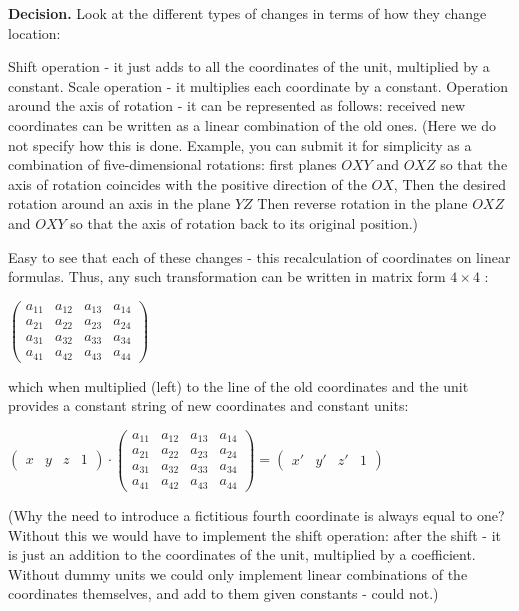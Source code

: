\textbf{Decision.} Look at the different types of changes in terms of how they change location:

Shift operation - it just adds to all the coordinates of the unit, multiplied by a constant.
Scale operation - it multiplies each coordinate by a constant.
Operation around the axis of rotation - it can be represented as follows: received new coordinates can be written as a linear combination of the old ones.
(Here we do not specify how this is done. Example, you can submit it for simplicity as a combination of five-dimensional rotations: first planes $OXY$ and $OXZ$ so that the axis of rotation coincides with the positive direction of the $OX$, Then the desired rotation around an axis in the plane $YZ$ Then reverse rotation in the plane $OXZ$ and $OXY$ so that the axis of rotation back to its original position.)

Easy to see that each of these changes - this recalculation of coordinates on linear formulas. Thus, any such transformation can be written in matrix form $4 \times 4$ :

$\left(\begin{array}{cccc}
a_{11} & a_{12} & a_{13} & a_{14}\\
a_{21} & a_{22} & a_{23} & a_{24}\\
a_{31} & a_{32} & a_{33} & a_{34}\\
a_{41} & a_{42} & a_{43} & a_{44}
\end{array}\right)$

which when multiplied (left) to the line of the old coordinates and the unit provides a constant string of new coordinates and constant units:

$\left(\begin{array}{cccc}
x & y & z & 1\end{array}\right)\cdot\left(\begin{array}{cccc}
a_{11} & a_{12} & a_{13} & a_{14}\\
a_{21} & a_{22} & a_{23} & a_{24}\\
a_{31} & a_{32} & a_{33} & a_{34}\\
a_{41} & a_{42} & a_{43} & a_{44}
\end{array}\right)=\left(\begin{array}{cccc}
x' & y' & z' & 1\end{array}\right)$

(Why the need to introduce a fictitious fourth coordinate is always equal to one? Without this we would have to implement the shift operation: after the shift - it is just an addition to the coordinates of the unit, multiplied by a coefficient. Without dummy units we could only implement linear combinations of the coordinates themselves, and add to them given constants - could not.)

